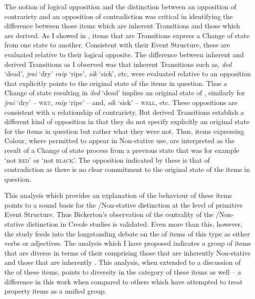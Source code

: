 The notion of logical opposition and the distinction between an opposition of contrariety and an opposition of contradiction was critical in identifying the difference between those items which are inherent Transitions and those which are derived. As I showed in , items that are Transitions express a Change of state from one state to another. Consistent with their Event Structure, these are evaluated relative to their logical opposite. The difference between inherent and derived Transitions as I observed was that inherent Transitions such as, \textit{ded} `dead', \textit{jrai} `dry' \textit{raip} `ripe', \textit{sik} `sick', etc. were evaluated relative to an opposition that explicitly points to the original state of the items in question. Thus a Change of state resulting in \textit{ded} `dead' implies an original state of \ALIVE, similarly for \textit{jrai} `dry' -- \textsc{wet}, \textit{raip} `ripe' -- \GREEN and, \textit{sik} `sick' -- \textsc{well}, etc. These oppositions are consistent with a relationship of contrariety. But derived Transitions establish a different kind of opposition in that they do not specify explicitly an original state for the items in question but rather what they were not. Thus, items expressing Colour, where permitted to appear in Non-stative use, are interpreted as the result of a Change of state process from a previous state that was for example `not \textsc{red}' or `not \textsc{black}'. The opposition indicated by these is that of contradiction as there is no clear commitment to the original state of the items in question. 

This analysis which provides an explanation of the behaviour of these items points to a sound basis for the \slash Non-stative distinction at the level of primitive Event Structure. Thus Bickerton’s observation of the centrality of the \slash Non-stative distinction in Creole studies is validated. Even more than this, however, the study feeds into the longstanding debate on the  of items of this type as either verbs or adjectives. The analysis which I have proposed indicates a group of items that are diverse in terms of their  comprising those that are inherently Non-stative and those that are inherently . This analysis, when extended to a discussion of the  of these items, points to diversity in the category of these items as well -- a difference in this work when compared to others which have attempted to treat property items as a unified group. 

